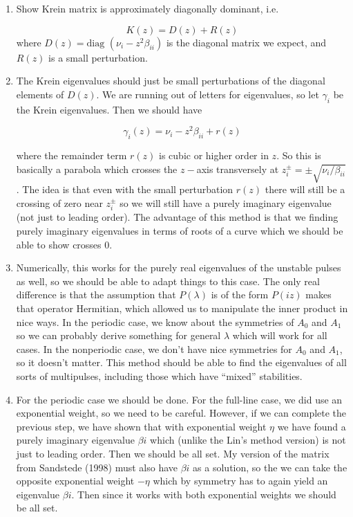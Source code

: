 \documentclass[12pt]{article}
\begin{document}
\begin{enumerate}
\item Show Krein matrix is approximately diagonally dominant, i.e.

\[
K(z) = D(z) + R(z)
\]
where $D(z) = \text{diag }( \nu_i  - z^2 \beta_{ii})$ is the diagonal matrix we expect, and $R(z)$ is a small perturbation. 

\item The Krein eigenvalues should just be small perturbations of the diagonal elements of $D(z)$. We are running out of letters for eigenvalues, so let $\gamma_i$ be the Krein eigenvalues. Then we should have

\[
\gamma_i(z) = \nu_i  - z^2 \beta_{ii} + r(z)
\]

where the remainder term $r(z)$ is cubic or higher order in $z$. So this is basically a parabola which crosses the $z-$axis transversely at $z_i^\pm = \pm \sqrt{\nu_i / \beta_{ii}}$. The idea is that even with the small perturbation $r(z)$ there will still be a crossing of zero near $z_i^\pm$ so we will still have a purely imaginary eigenvalue (not just to leading order). The advantage of this method is that we finding purely imaginary eigenvalues in terms of roots of a curve which we should be able to show crosses 0.

\item Numerically, this works for the purely real eigenvalues of the unstable pulses as well, so we should be able to adapt things to this case. The only real difference is that the assumption that $P(\lambda)$ is of the form $P(iz)$ makes that operator Hermitian, which allowed us to manipulate the inner product in nice ways. In the periodic case, we know about the symmetries of $A_0$ and $A_1$ so we can probably derive something for general $\lambda$ which will work for all cases. In the nonperiodic case, we don't have nice symmetries for $A_0$ and $A_1$, so it doesn't matter. This method should be able to find the eigenvalues of all sorts of multipulses, including those which have ``mixed'' stabilities.

\item For the periodic case we should be done. For the full-line case, we did use an exponential weight, so we need to be careful. However, if we can complete the previous step, we have shown that with exponential weight $\eta$ we have found a purely imaginary eigenvalue $\beta i$ which (unlike the Lin's method version) is not just to leading order. Then we should be all set. My version of the matrix from Sandstede (1998) must also have $\beta i$ as a solution, so the we can take the opposite exponential weight $-\eta$ which by symmetry has to again yield an eigenvalue $\beta i$. Then since it works with both exponential weights we should be all set.


\end{enumerate}
\end{document}
